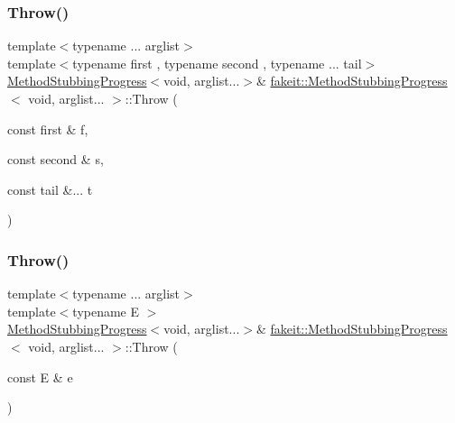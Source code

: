 \mbox{\label{structfakeit_1_1MethodStubbingProgress_3_01void_00_01arglist_8_8_8_01_4_a2db97b61a39cc6cecc379f6d51234c8a}} 
\subsubsection{\texorpdfstring{Throw()}{Throw()}\hspace{0.1cm}{\footnotesize\ttfamily [12/27]}}
{\footnotesize\ttfamily template$<$typename ... arglist$>$ \\
template$<$typename first , typename second , typename ... tail$>$ \\
\mbox{\hyperlink{structfakeit_1_1MethodStubbingProgress}{Method\+Stubbing\+Progress}}$<$void, arglist...$>$\& \mbox{\hyperlink{structfakeit_1_1MethodStubbingProgress}{fakeit\+::\+Method\+Stubbing\+Progress}}$<$ void, arglist... $>$\+::Throw (\begin{DoxyParamCaption}\item[{const first \&}]{f,  }\item[{const second \&}]{s,  }\item[{const tail \&...}]{t }\end{DoxyParamCaption})\hspace{0.3cm}{\ttfamily [inline]}}

\mbox{\label{structfakeit_1_1MethodStubbingProgress_3_01void_00_01arglist_8_8_8_01_4_a8b0d920dc6424eadd7dce7cb9df66814}} 
\subsubsection{\texorpdfstring{Throw()}{Throw()}\hspace{0.1cm}{\footnotesize\ttfamily [13/27]}}
{\footnotesize\ttfamily template$<$typename ... arglist$>$ \\
template$<$typename E $>$ \\
\mbox{\hyperlink{structfakeit_1_1MethodStubbingProgress}{Method\+Stubbing\+Progress}}$<$void, arglist...$>$\& \mbox{\hyperlink{structfakeit_1_1MethodStubbingProgress}{fakeit\+::\+Method\+Stubbing\+Progress}}$<$ void, arglist... $>$\+::Throw (\begin{DoxyParamCaption}\item[{const E \&}]{e }\end{DoxyParamCaption})\hspace{0.3cm}{\ttfamily [inline]}}

